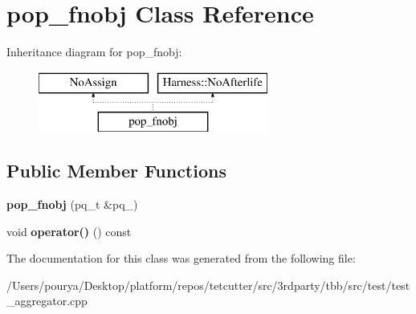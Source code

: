 \hypertarget{classpop__fnobj}{}\section{pop\+\_\+fnobj Class Reference}
\label{classpop__fnobj}
Inheritance diagram for pop\+\_\+fnobj\+:\begin{figure}[H]
\begin{center}
\leavevmode
\includegraphics[height=2.000000cm]{classpop__fnobj}
\end{center}
\end{figure}
\subsection*{Public Member Functions}
\begin{DoxyCompactItemize}
\item 
\hypertarget{classpop__fnobj_ae2778d4497143d889441472b6055d3f1}{}{\bfseries pop\+\_\+fnobj} (pq\+\_\+t \&pq\+\_\+)\label{classpop__fnobj_ae2778d4497143d889441472b6055d3f1}

\item 
\hypertarget{classpop__fnobj_a6119b7e90fe5d4d9cf9f1c67eb478805}{}void {\bfseries operator()} () const \label{classpop__fnobj_a6119b7e90fe5d4d9cf9f1c67eb478805}

\end{DoxyCompactItemize}


The documentation for this class was generated from the following file\+:\begin{DoxyCompactItemize}
\item 
/\+Users/pourya/\+Desktop/platform/repos/tetcutter/src/3rdparty/tbb/src/test/test\+\_\+aggregator.\+cpp\end{DoxyCompactItemize}

